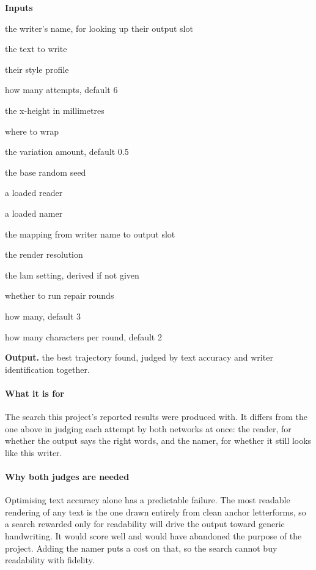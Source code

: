 \noindent\textbf{Inputs}
\begin{description}[leftmargin=2.2em,style=nextline,font=\normalfont\ttfamily]\setlength\itemsep{1pt}
  \item[{author}] \normalfont the writer's name, for looking up their output slot
  \item[{text}] \normalfont the text to write
  \item[{profile}] \normalfont their style profile
  \item[{nTries}] \normalfont how many attempts, default 6
  \item[{mmPerXh}] \normalfont the x-height in millimetres
  \item[{lineWidthMm}] \normalfont where to wrap
  \item[{jitter}] \normalfont the variation amount, default 0.5
  \item[{seed}] \normalfont the base random seed
  \item[{reader}] \normalfont a loaded reader
  \item[{authorModel}] \normalfont a loaded namer
  \item[{authorMapping}] \normalfont the mapping from writer name to output slot
  \item[{pxPerMm}] \normalfont the render resolution
  \item[{legibility}] \normalfont the lam setting, derived if not given
  \item[{repair}] \normalfont whether to run repair rounds
  \item[{repairRounds}] \normalfont how many, default 3
  \item[{repairWorstK}] \normalfont how many characters per round, default 2
\end{description}

\noindent\textbf{Output.} the best trajectory found, judged by text accuracy and writer identification together.


\paragraph{What it is for}
The search this project's reported results were produced with. It differs from the one above in judging each attempt by both networks at once: the reader, for whether the output says the right words, and the namer, for whether it still looks like this writer.


\paragraph{Why both judges are needed}
Optimising text accuracy alone has a predictable failure. The most readable rendering of any text is the one drawn entirely from clean anchor letterforms, so a search rewarded only for readability will drive the output toward generic handwriting. It would score well and would have abandoned the purpose of the project. Adding the namer puts a cost on that, so the search cannot buy readability with fidelity.


